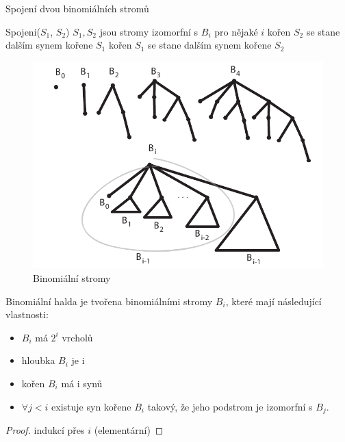 \begin{algorithm}[!htb]
\caption{Spojení dvou binomiálních stromů}
\label{alg:heaps.binom.spoj}
\begin{algorithmic}
\STATE Spojeni($S_1$, $S_2$)
\STATE $S_1, S_2$ jsou stromy izomorfní s $B_i$ pro nějaké $i$
  \STATE kořen $S_2$ se stane dalším synem kořene $S_1$
\ELSE
  \STATE kořen $S_1$ se stane dalším synem kořene $S_2$
\ENDIF
\end{algorithmic}
\end{algorithm}

\begin{figure}[!htb]
\centering\includegraphics{pics/binheaps}
\caption{Binomiální stromy}
\label{fig.heaps.binomial}
\end{figure}

\begin{tvrzeni}
Binomiální halda je tvořena binomiálními stromy $B_i$, které mají následující
vlastnosti: 
\begin{itemize}
\item $B_i$ má $2^i$ vrcholů
\item hloubka $B_i$ je i
\item kořen $B_i$ má i synů
\item $\forall j < i$ existuje syn kořene $B_i$ takový, že 
  jeho podstrom je izomorfní s $B_j$.
\end{itemize}
\end{tvrzeni}

\begin{proof}
indukcí přes $i$ (elementární)
\end{proof}


